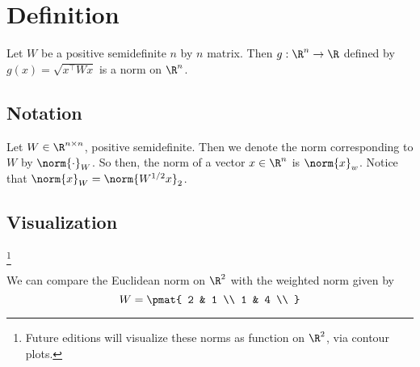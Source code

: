 

\section*{Definition}

\begin{proposition}
Let $W$ be a positive semidefinite $n$ by $n$ matrix.
Then $g: \R ^n \to \R $ defined by $g(x) = \sqrt{x^\top  W x}$ is a norm on $\R ^n$.
\end{proposition}

\subsection*{Notation}

Let $W \in \R ^{n \times n}$, positive semidefinite.
Then we denote the norm corresponding to $W$ by $\norm{\cdot }_{W}$.
So then, the norm of a vector $x \in \R ^n$ is $\norm{x}_{w}$.
Notice that $\norm{x}_{W} = \norm{W^{1/2}x}_2$.

\subsection*{Visualization}

\footnote{Future editions will visualize these norms as function on $\R ^2$, via contour plots.}

We can compare the Euclidean norm on $\R ^2$ with the weighted norm given by
\[
W = \pmat{
2 & 1 \\
1 & 4 \\
}
\]


\blankpage